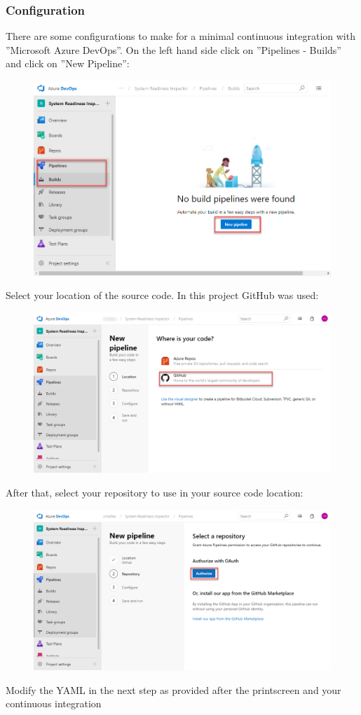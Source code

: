 \subsubsection{Configuration}
There are some configurations to make for a minimal continuous integration with ''Microsoft Azure DevOps''. On the left hand side click on ''Pipelines - Builds'' and click on ''New Pipeline'':
\begin{figure}[H]
    \centering
    \includegraphics[width=0.7\linewidth]{../developer_manual/assets/devops1.png}
\end{figure}
Select your location of the source code. In this project GitHub was used:
\begin{figure}[H]
    \centering
    \includegraphics[width=0.7\linewidth]{../developer_manual/assets/devops2.png}
\end{figure}
After that, select your repository to use in your source code location:
\begin{figure}[H]
    \centering
    \includegraphics[width=0.7\linewidth]{../developer_manual/assets/devops3.png}
\end{figure}
Modify the YAML in the next step as provided after the printscreen and your continuous integration 

